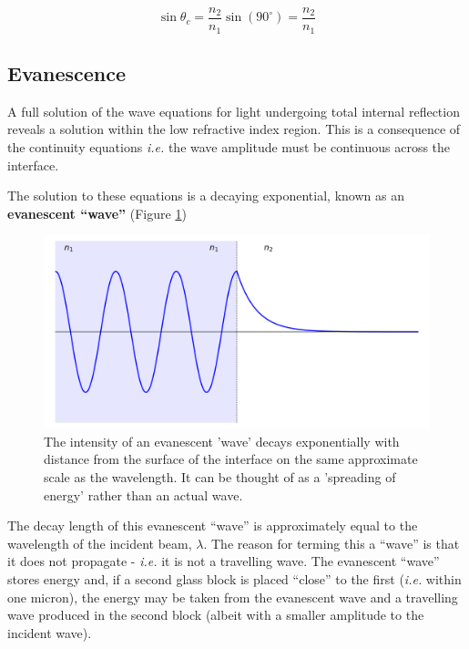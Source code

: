 \documentclass[
]{book}
\begin{document}
\begin{equation}
\sin \theta_c = \frac{n_2}{n_1}\sin(90^\circ) = \frac{n_2}{n_1}
\end{equation}

\hypertarget{sec-ch14-evanescence}{%
\subsection{Evanescence}\label{sec-ch14-evanescence}}

A full solution of the wave equations for light undergoing total internal reflection reveals a solution within the low refractive index region. This is a consequence of the continuity equations \emph{i.e.} the wave amplitude must be continuous across the interface.

The solution to these equations is a decaying exponential, known as an \textbf{evanescent ``wave''} (Figure \ref{fig:ch14-evanescentwave1})

\begin{figure}

{\centering \includegraphics[width=0.7\linewidth]{visualisations/ch14-evansecent1} 

}

\caption{The intensity of an evanescent 'wave' decays exponentially with distance from the surface of the interface on the same approximate scale as the wavelength. It can be thought of as a 'spreading of energy' rather than an actual wave.}\label{fig:ch14-evanescentwave1}
\end{figure}

The decay length of this evanescent ``wave'' is approximately equal to the wavelength of the incident beam, \(\lambda\). The reason for terming this a ``wave'' is that it does not propagate - \emph{i.e.} it is not a travelling wave. The evanescent ``wave'' stores energy and, if a second glass block is placed ``close'' to the first (\emph{i.e.} within one micron), the energy may be taken from the evanescent wave and a travelling wave produced in the second block (albeit with a smaller amplitude to the incident wave).
\end{document}
